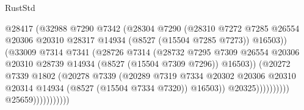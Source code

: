 \begin{lexlean}{RustStd}
\begin{coremodule}
                                        @28417
                                        (@32988
                                          @7290
                                          @7342
                                          (@28304
                                            @7290
                                            (@28310
                                              @7272
                                              @7285
                                              @26554
                                              @20306
                                              @20310
                                              @28317
                                              @14934
                                              (@8527 (@15504 @7285 @7273))
                                              @16503))
                                          (@33009
                                            @7314
                                            @7341
                                            (@28726
                                              @7314
                                              (@28732
                                                @7295
                                                @7309
                                                @26554
                                                @20306
                                                @20310
                                                @28739
                                                @14934
                                                (@8527 (@15504 @7309 @7296))
                                                @16503))
                                            (@20272
                                              @7339
                                              @1802
                                              (@20278
                                                @7339
                                                (@20289
                                                  @7319
                                                  @7334
                                                  @20302
                                                  @20306
                                                  @20310
                                                  @20314
                                                  @14934
                                                  (@8527 (@15504 @7334 @7320))
                                                  @16503))
                                              @20325))))))))))
                          @25659)))))))))))

\end{coremodule}
\end{lexlean}
